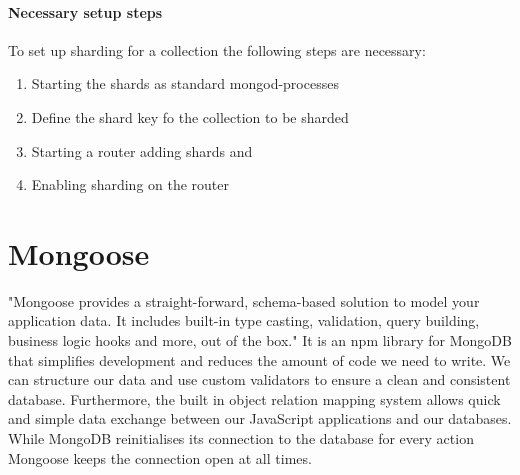 \documentclass[11pt]{article}
\begin{document}
\paragraph{Necessary setup steps}
To set up sharding for a collection the following steps are necessary:

\begin{enumerate}
	\item Starting the shards as standard mongod-processes 
    \item Define the shard key fo the collection to be sharded
    \item  Starting a router adding shards and 
	\item Enabling sharding on the router
\end{enumerate}
   


\section{Mongoose}
"Mongoose provides a straight-forward, schema-based solution to model your application data. It includes built-in type casting, validation, query building, business logic hooks and more, out of the box." \cite{mongooseintro} It is an npm library for MongoDB that simplifies development and reduces the amount of code we need to write. We can structure our data and use custom validators to ensure a clean and consistent database. Furthermore, the built in object relation mapping system allows quick and simple data exchange between our JavaScript applications and our databases. While MongoDB reinitialises its connection to the database for every action Mongoose keeps the connection open at all times. 
\end{document}
